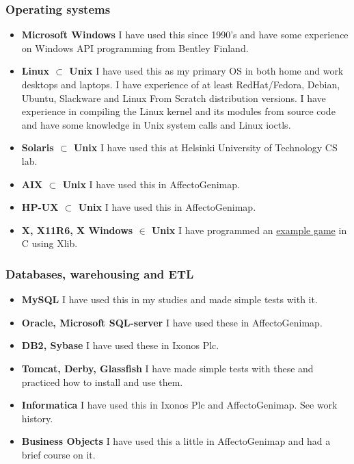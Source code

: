 \documentclass[a4paper,12pt]{article}
\begin{document}
\subsubsection*{Operating systems}
\begin{itemize}
\item{\bf Microsoft Windows}
I have used this since 1990's and have some experience on Windows API programming
from Bentley Finland.
\item{\bf Linux $\subset$ Unix}
I have used this as my primary OS in both home and work desktops and laptops.
I have experience of at least RedHat/Fedora, Debian, Ubuntu, Slackware and Linux
From Scratch distribution versions. I have experience in compiling the Linux kernel
and its modules from source code and have some knowledge in Unix system calls and
Linux ioctls.
\item{\bf Solaris $\subset$ Unix}
I have used this at Helsinki University of Technology CS lab.
\item{\bf AIX $\subset$ Unix}
I have used this in AffectoGenimap.
\item{\bf HP-UX $\subset$ Unix}
I have used this in AffectoGenimap.
\item{\bf X, X11R6, X Windows $\in$ Unix}
I have programmed an \href{http://math.tkk.fi/~mnummeli/tite/catch.en.html}
{example game} in C using Xlib.
\end{itemize}

\subsubsection*{Databases, warehousing and ETL}
\begin{itemize}
\item{\bf MySQL}
I have used this in my studies and made simple tests with it.
\item{\bf Oracle, Microsoft SQL-server}
I have used these in AffectoGenimap.
\item{\bf DB2, Sybase}
I have used these in Ixonos Plc.
\item{\bf Tomcat, Derby, Glassfish}
I have made simple tests with these and practiced how to install and use them.
\item{\bf Informatica}
I have used this in Ixonos Plc and AffectoGenimap. See work history.
\item{\bf Business Objects}
I have used this a little in AffectoGenimap and had a brief course on it.
\end{itemize}
\end{document}
